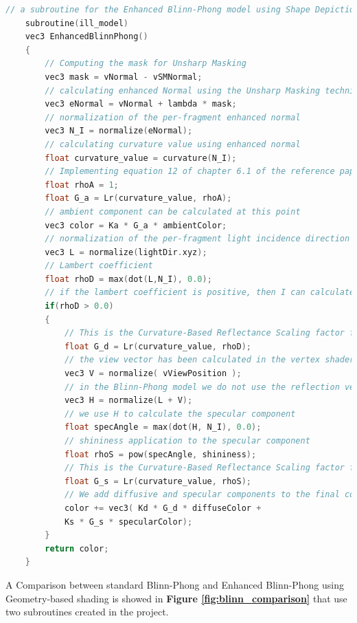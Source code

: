 \begin{lstlisting}[language=C++, caption=Enhanced Blinn-Phong subroutine and Curvature-Based Reflectance scaling function implemented in fragment shader,label={code:blinn-phong-enhanced}]
	// a subroutine for the Enhanced Blinn-Phong model using Shape Depiction Enhancement based on local Geometry 
	subroutine(ill_model)
	vec3 EnhancedBlinnPhong()
	{
		// Computing the mask for Unsharp Masking
		vec3 mask = vNormal - vSMNormal;
		// calculating enhanced Normal using the Unsharp Masking technique. This is defined, in the reference paper, in equation 6 of chapter 4.2.2
		vec3 eNormal = vNormal + lambda * mask;
		// normalization of the per-fragment enhanced normal 
		vec3 N_I = normalize(eNormal);
		// calculating curvature value using enhanced normal
		float curvature_value = curvature(N_I);
		// Implementing equation 12 of chapter 6.1 of the reference paper. I calculate the Curvature-Based Reflectance Scaling factor for each of the Blinn-Phong components. NOTE: Reference paper use the costant 1 as rho_a component for ambient
		float rhoA = 1;
		float G_a = Lr(curvature_value, rhoA);  
		// ambient component can be calculated at this point
		vec3 color = Ka * G_a * ambientColor;
		// normalization of the per-fragment light incidence direction
		vec3 L = normalize(lightDir.xyz);
		// Lambert coefficient
		float rhoD = max(dot(L,N_I), 0.0);
		// if the lambert coefficient is positive, then I can calculate the specular component
		if(rhoD > 0.0)
		{
			// This is the Curvature-Based Reflectance Scaling factor for the diffuse component. NOTE: Reference paper use the lambertian coefficient as rho_d for diffuse
			float G_d = Lr(curvature_value, rhoD); 
			// the view vector has been calculated in the vertex shader, already negated to have direction from the mesh to the camera
			vec3 V = normalize( vViewPosition );
			// in the Blinn-Phong model we do not use the reflection vector, but the half vector
			vec3 H = normalize(L + V);
			// we use H to calculate the specular component
			float specAngle = max(dot(H, N_I), 0.0);
			// shininess application to the specular component
			float rhoS = pow(specAngle, shininess);
			// This is the Curvature-Based Reflectance Scaling factor for the specular component. NOTE: Reference paper use the lambertian coefficient as rho_s for specular
			float G_s = Lr(curvature_value, rhoS);
			// We add diffusive and specular components to the final color using our Curvature-Based factors
			color += vec3( Kd * G_d * diffuseColor +
			Ks * G_s * specularColor);
		}
		return color;
	}

\end{lstlisting}
A Comparison between standard Blinn-Phong and Enhanced Blinn-Phong using Geometry-based shading is showed in \textbf{Figure \ref{fig:blinn_comparison}} that use two subroutines created in the project.

